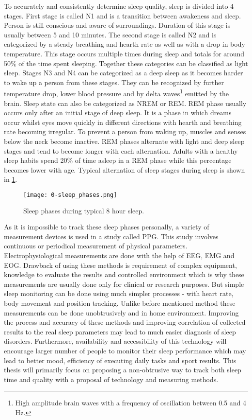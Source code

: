 To accurately and consistently determine sleep quality, sleep is divided into 4 stages. First stage is called N1 and is a transition between awakeness and sleep. Person is still conscious and aware of surroundings. Duration of this stage is usually between 5 and 10 minutes. The second stage is called N2 and is categorized by a steady breathing and hearth rate as well as with a drop in body temperature. This stage occurs multiple times during sleep and totals for around 50\% of the time spent sleeping. Together these categories can be classified as light sleep. Stages N3 and N4 can be categorized as a deep sleep as it becomes harder to wake up a person from these stages. They can be recognized by further temperature drop, lower blood pressure and by delta waves\footnote{High amplitude brain waves with a frequency of oscillation between 0.5 and 4 Hz.} emitted by the brain. Sleep state can also be categorized as \ac{NREM} or \ac{REM}. REM phase usually occurs only after an initial stage of deep sleep. It is a phase in which dreams occur whilst eyes move quickly in different directions with hearth and breathing rate becoming irregular. To prevent a person from waking up, muscles and senses below the neck become inactive. \ac{REM} phases alternate with light and deep sleep stages and tend to become longer with each alternation. Adults with a healthy sleep habits spend 20\% of time asleep in a \ac{REM} phase while this percentage becomes lower with age. Typical alternation of sleep stages during sleep is shown in \ref{fig:sleep-phases}. \\

\begin{figure}[h]
  \begin{center}
    \texttt{[image: 0-sleep\_phases.png]}
  \end{center}
  \caption{Sleep phases during typical 8 hour sleep.}
  \label{fig:sleep-phases}
\end{figure}

As it is impossible to track these sleep phases personally, a variety of measurement devices is used in a study called \ac{PPG}. This study involves continuous or periodical measurement of physical parameters. Electrophysiological measurements are done with the help of \ac{EEG}, \ac{EMG} and \ac{EOG}. Drawback of using these methods is requirement of complex equipment, knowledge to evaluate the results and controlled environment which is why these measurements are usually done only for clinical or research purposes. But simple sleep monitoring can be done using much simpler processes - with heart rate, body movement and position tracking. Unlike before mentioned method these measurements can be done unobtrusively and in home environment. Improving the process and accuracy of these methods and improving correlation of collected results to the real sleep parameters may lead to much easier diagnosis of sleep disorders. Furthermore, availability and accessibility of this technology will encourage larger number of people to monitor their sleep performance which may lead to better mood, efficiency of executing daily tasks and sport results. This thesis will primarily focus on proposing a non-obtrusive way to track both sleep time and quality with a proposal of technology and measuring methods.


